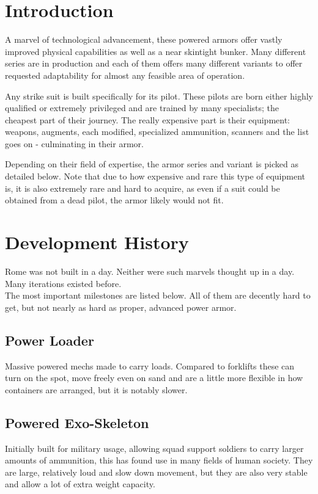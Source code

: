 \documentclass[12pt,a4paper,openany,usenames,dvipsnames]{book}
\begin{document}
	

	\chapter{Introduction}
	A marvel of technological advancement, these powered armors offer vastly improved physical capabilities as well as a near skintight bunker. Many different series are in production and each of them offers many different variants to offer requested adaptability for almost any feasible area of operation.\par
	Any strike suit is built specifically for its pilot. These pilots are born either highly qualified or extremely privileged and are trained by many specialists; the cheapest part of their journey. The really expensive part is their equipment: weapons, augments, each modified, specialized ammunition, scanners and the list goes on - culminating in their armor.\par
	Depending on their field of expertise, the armor series and variant is picked as detailed below. Note that due to how expensive and rare this type of equipment is, it is also extremely rare and hard to acquire, as even if a suit could be obtained from a dead pilot, the armor likely would not fit.
	
	\chapter{Development History}
	Rome was not built in a day. Neither were such marvels thought up in a day. Many iterations existed before.
	\\%
	The most important milestones are listed below. All of them are decently hard to get, but not nearly as hard as proper, advanced power armor.
	\section{Power Loader}
	Massive powered mechs made to carry loads. Compared to forklifts these can turn on the spot, move freely even on sand and are a little more flexible in how containers are arranged, but it is notably slower.
	\par
	\section{Powered Exo-Skeleton}
	Initially built for military usage, allowing squad support soldiers to carry larger amounts of ammunition, this has found use in many fields of human society. They are large, relatively loud and slow down movement, but they are also very stable and allow a lot of extra weight capacity.
	\par
\end{document}
